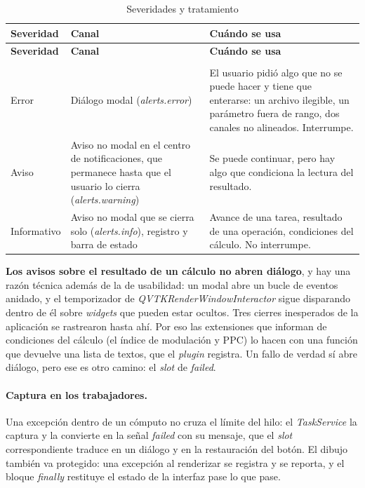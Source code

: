 \documentclass[12pt,letterpaper,oneside]{article}
\DeclareRobustCommand{\_}{\textunderscore\allowbreak}
\begin{document}
\begin{center}
\small
\begin{longtable}{|p{}|p{}|p{}|}
\hline
\textbf{Severidad} & \textbf{Canal} & \textbf{Cuándo se usa} \\
\hline
\endfirsthead
\hline
\textbf{Severidad} & \textbf{Canal} & \textbf{Cuándo se usa} \\
\hline
\endhead
\hline
\endfoot
\hline
\caption{Severidades y tratamiento} \label{tab:sdd_severidades} \\
\endlastfoot

Error & Diálogo modal (\textit{alerts.error}) & El usuario pidió algo que no se puede hacer y tiene que enterarse: un archivo ilegible, un parámetro fuera de rango, dos canales no alineados. Interrumpe. \\
\hline
Aviso & Aviso no modal en el centro de notificaciones, que permanece hasta que el usuario lo cierra (\textit{alerts.warning}) & Se puede continuar, pero hay algo que condiciona la lectura del resultado. \\
\hline
Informativo & Aviso no modal que se cierra solo (\textit{alerts.info}), registro y barra de estado & Avance de una tarea, resultado de una operación, condiciones del cálculo. No interrumpe. \\
\hline

\end{longtable}
\end{center}

\textbf{Los avisos sobre el resultado de un cálculo no abren diálogo}, y hay una razón técnica además de la de usabilidad: un modal abre un bucle de eventos anidado, y el temporizador de \textit{QVTKRenderWindowInteractor} sigue disparando dentro de él sobre \textit{widgets} que pueden estar ocultos. Tres cierres inesperados de la aplicación se rastrearon hasta ahí. Por eso las extensiones que informan de condiciones del cálculo (el índice de modulación y PPC) lo hacen con una función que devuelve una lista de textos, que el \textit{plugin} registra. Un fallo de verdad sí abre diálogo, pero ese es otro camino: el \textit{slot} de \textit{failed}.

\paragraph{Captura en los trabajadores.} Una excepción dentro de un cómputo no cruza el límite del hilo: el \textit{TaskService} la captura y la convierte en la señal \textit{failed} con su mensaje, que el \textit{slot} correspondiente traduce en un diálogo y en la restauración del botón. El dibujo también va protegido: una excepción al renderizar se registra y se reporta, y el bloque \textit{finally} restituye el estado de la interfaz pase lo que pase.
\end{document}
